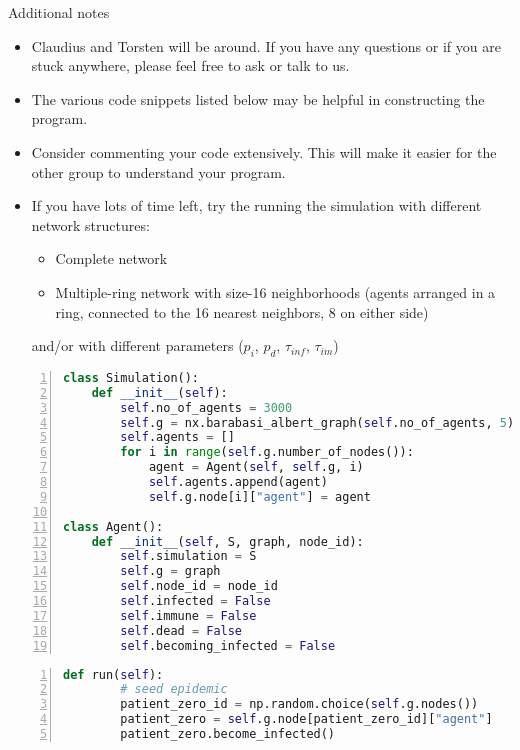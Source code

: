 \documentclass[25pt,a4paper]{article}
\begin{document}
$$$$
Additional notes
\begin{itemize}
  \item Claudius and Torsten will be around. If you have any questions or if you are stuck anywhere, please feel free to ask or talk to us.
  \item The various code snippets listed below may be helpful in constructing the program.
  \item Consider commenting your code extensively. This will make it easier for the other group to understand your program.
  \item If you have lots of time left, try the running the simulation with different network structures:
  \begin{itemize}
    \item Complete network
    \item Multiple-ring network with size-16 neighborhoods (agents arranged in a ring, connected to the 16 nearest neighbors, 8 on either side)
  \end{itemize}
        and/or with different parameters ($p_i$, $p_d$, $\tau_{inf}$, $\tau_{im}$)
\end{itemize}

\small

\begin{lstlisting}[language=Python,frame=single,numbers=left,title=Script: Possible constructor methods of Simulation class and Agent class]
class Simulation():
    def __init__(self):
        self.no_of_agents = 3000
        self.g = nx.barabasi_albert_graph(self.no_of_agents, 5)
        self.agents = []
        for i in range(self.g.number_of_nodes()):
            agent = Agent(self, self.g, i)
            self.agents.append(agent)
            self.g.node[i]["agent"] = agent

class Agent():
    def __init__(self, S, graph, node_id):
        self.simulation = S
        self.g = graph
        self.node_id = node_id
        self.infected = False
        self.immune = False
        self.dead = False
        self.becoming_infected = False
\end{lstlisting}
\normalsize

\begin{lstlisting}[language=Python,frame=single,numbers=left,title=Script: Possibility for seeding the epidemic (in this case in a run function in the Simulation class)]
    def run(self):
        # seed epidemic
        patient_zero_id = np.random.choice(self.g.nodes())
        patient_zero = self.g.node[patient_zero_id]["agent"]
        patient_zero.become_infected()
\end{lstlisting}
\normalsize
\end{document}
